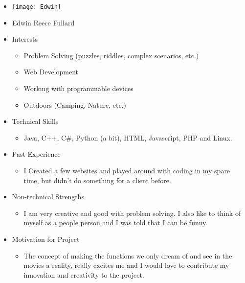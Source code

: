 
\begin{itemize}
	\item[] \texttt{[image: Edwin]}
	\item[] Edwin Reece Fullard
	\item Interests
	\begin{itemize}
		\item Problem Solving (puzzles, riddles, complex scenarios, etc.)
		\item Web Development
		\item Working with programmable devices
		\item Outdoors (Camping, Nature, etc.)
	\end{itemize}
	\item Technical Skills
	\begin{itemize}
		\item[] Java, C++, C\#, Python (a bit), HTML, Javascript, PHP and Linux.
	\end{itemize}
	\item Past Experience
	\begin{itemize}
		\item[] I Created a few websites and played around with coding in my spare time, but didn't do something for a client before.
	\end{itemize}
	\item Non-technical Strengths
	\begin{itemize}
		\item[] I am very creative and good with problem solving. I also like to think of myself as a people person and I was told that I can be funny.
	\end{itemize}
	\item Motivation for Project
	\begin{itemize}
		\item[] The concept of making the functions we only dream of and see in the movies a reality, really excites me and I would love to contribute my innovation and creativity to the project.
	\end{itemize}
\end{itemize}